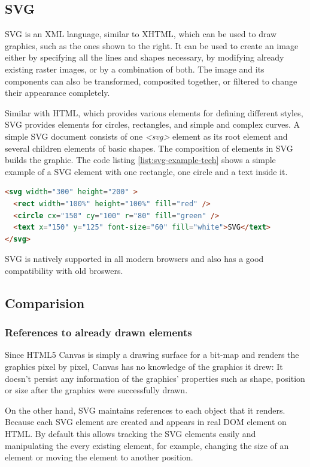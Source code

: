 \subsection{SVG}

SVG is an XML language, similar to XHTML, which can be used to draw graphics, such as the ones shown to the right. It can be used to create an image either by specifying all the lines and shapes necessary, by modifying already existing raster images, or by a combination of both. The image and its components can also be transformed, composited together, or filtered to change their appearance completely\cite{SVGintro}.

Similar with HTML, which provides various elements for defining different styles, SVG provides elements for circles, rectangles, and simple and complex curves. A simple SVG document consists of one \textit{<svg>} element as its root element and several children elements of basic shapes. The composition of elements in SVG builds the graphic. The code listing \ref{list:svg-example-tech} shows a simple example of a SVG element with one rectangle, one circle and a text inside it.

\begin{lstlisting}[language=HTML, caption=Simple Example of SVG elemnt, label={list:svg-example-tech}]
<svg width="300" height="200" >
  <rect width="100%" height="100%" fill="red" />
  <circle cx="150" cy="100" r="80" fill="green" />
  <text x="150" y="125" font-size="60" fill="white">SVG</text>
</svg>
\end{lstlisting}


SVG is natively supported in all modern browsers and also has a good compatibility with old broswers\cite{ferraiolo2000scalable}. 

\subsection{Comparision}

\subsubsection{References to already drawn elements}
Since HTML5 Canvas is simply a drawing surface for a bit-map and renders the graphics pixel by pixel, Canvas has no knowledge of the graphics it drew: It doesn’t persist any information of the graphics' properties such as shape, position or size after the graphics were successfully drawn.

On the other hand, SVG maintains references to each object that it renders. Because each SVG element are created and appears in real DOM element on HTML. By default this allows tracking the SVG elements easily and manipulating the every existing element, for example, changing the size of an element or moving the element to another position.

